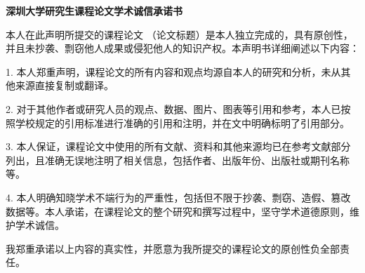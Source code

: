 \begin{titlepage}
    { %
        \centering %

        {\bfseries \Large 深圳大学研究生课程论文学术诚信承诺书 \\[1.5cm]}
        \raggedright                %
        \setlength{\parskip}{0pt}   %
        \setlength{\parindent}{2em} %

        
        本人在此声明所提交的课程论文 \underline{\hspace{6em}}（论文标题）是本人独立完成的，具有原创性，并且未抄袭、剽窃他人成果或侵犯他人的知识产权。本声明书详细阐述以下内容：

        1. 本人郑重声明，课程论文的所有内容和观点均源自本人的研究和分析，未从其他来源直接复制或翻译。

        2. 对于其他作者或研究人员的观点、数据、图片、图表等引用和参考，本人已按照学校规定的引用标准进行准确的引用和注明，并在文中明确标明了引用部分。

        3. 本人保证，课程论文中使用的所有文献、资料和其他来源均已在参考文献部分列出，且准确无误地注明了相关信息，包括作者、出版年份、出版社或期刊名称等。

        4. 本人明确知晓学术不端行为的严重性，包括但不限于抄袭、剽窃、造假、篡改数据等。本人承诺，在课程论文的整个研究和撰写过程中，坚守学术道德原则，维护学术诚信。

        我郑重承诺以上内容的真实性，并愿意为我所提交的课程论文的原创性负全部责任。

        \vspace{1cm}
        \setlength{\parindent}{0pt} %
        
        
}
\end{titlepage}
